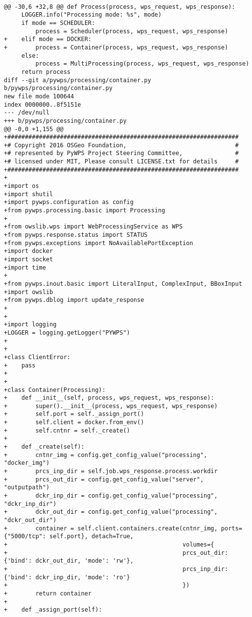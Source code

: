 \begin{lstlisting}[basicstyle=\small,caption={pywps diff file}]
 
@@ -30,6 +32,8 @@ def Process(process, wps_request, wps_response):
     LOGGER.info("Processing mode: %s", mode)
     if mode == SCHEDULER:
         process = Scheduler(process, wps_request, wps_response)
+    elif mode == DOCKER:
+        process = Container(process, wps_request, wps_response)
     else:
         process = MultiProcessing(process, wps_request, wps_response)
     return process
diff --git a/pywps/processing/container.py b/pywps/processing/container.py
new file mode 100644
index 0000000..8f5151e
--- /dev/null
+++ b/pywps/processing/container.py
@@ -0,0 +1,155 @@
+##################################################################
+# Copyright 2016 OSGeo Foundation,                               #
+# represented by PyWPS Project Steering Committee,               #
+# licensed under MIT, Please consult LICENSE.txt for details     #
+##################################################################
+
+import os
+import shutil
+import pywps.configuration as config
+from pywps.processing.basic import Processing
+
+from owslib.wps import WebProcessingService as WPS
+from pywps.response.status import STATUS
+from pywps.exceptions import NoAvailablePortException
+import docker
+import socket
+import time
+
+from pywps.inout.basic import LiteralInput, ComplexInput, BBoxInput
+import owslib
+from pywps.dblog import update_response
+
+
+import logging
+LOGGER = logging.getLogger("PYWPS")
+
+
+class ClientError:
+    pass
+
+
+class Container(Processing):
+    def __init__(self, process, wps_request, wps_response):
+        super().__init__(process, wps_request, wps_response)
+        self.port = self._assign_port()
+        self.client = docker.from_env()
+        self.cntnr = self._create()
+
+    def _create(self):
+        cntnr_img = config.get_config_value("processing", "docker_img")
+        prcs_inp_dir = self.job.wps_response.process.workdir
+        prcs_out_dir = config.get_config_value("server", "outputpath")
+        dckr_inp_dir = config.get_config_value("processing", "dckr_inp_dir")
+        dckr_out_dir = config.get_config_value("processing", "dckr_out_dir")
+        container = self.client.containers.create(cntnr_img, ports={"5000/tcp": self.port}, detach=True,
+                                                  volumes={
+                                                  prcs_out_dir: {'bind': dckr_out_dir, 'mode': 'rw'},
+                                                  prcs_inp_dir: {'bind': dckr_inp_dir, 'mode': 'ro'}
+                                                  })
+        return container
+
+    def _assign_port(self):

\end{lstlisting}
